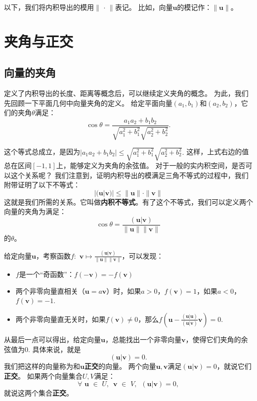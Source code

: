 \documentclass[12pt,UTF8,fontset=none]{ctexbook}
\begin{document}
以下，我们将内积导出的模用$\|\,\cdot\,\|$表记。
比如，向量$\mathbf{u}$的模记作：$\|\mathbf{u}\|$。

\section{夹角与正交}
\subsection{向量的夹角}
定义了内积导出的长度、距离等概念后，可以继续定义夹角的概念。
为此，我们先回顾一下平面几何中向量夹角的定义。
给定平面向量$(a_1, b_1)$和$(a_2, b_2)$，它们的夹角$\theta$满足：
$$ \cos \theta = \frac{a_1a_2 + b_1b_2}{\sqrt{a_1^2 + b_1^2}\sqrt{a_2^2 + b_2^2}}. $$

这个等式总成立，是因为$|a_1a_2 + b_1b_2| \leqslant \sqrt{a_1^2 + b_1^2}\sqrt{a_2^2 + b_2^2}.$ 
这样，上式右边的值总在区间$[-1,1]$上，能够定义为夹角的余弦值。
对于一般的实内积空间，是否可以这个关系呢？
我们注意到，证明内积导出的模满足三角不等式的过程中，我们附带证明了以下不等式：
$$ |(\mathbf{u} | \mathbf{v})| \leqslant \|\mathbf{u}\| \cdot \|\mathbf{v}\|$$
这就是我们所需的关系。它叫做\textbf{内积不等式}。有了这个不等式，我们可以定义两个向量的夹角为满足：
$$ \cos \theta = \frac{(\mathbf{u} | \mathbf{v})}{\|\mathbf{u}\|  \|\mathbf{v}\|} $$
的$\theta$。

给定向量$\mathbf{u}$，考察函数$ f: \,\, \mathbf{v} \mapsto \frac{(\mathbf{u} | \mathbf{v})}{\|\mathbf{u}\|  \|\mathbf{v}\|}$，可以发现：
\begin{itemize}
    \item $f$是一个“奇函数”：$f( -\mathbf{v}) = -f(\mathbf{v})$
    \item 两个非零向量直相关（$\mathbf{u} = a\mathbf{v}$）时，如果$a>0$，$f(\mathbf{v}) = 1$，如果$a<0$，$f(\mathbf{v}) = -1.$
    \item 两个非零向量直无关时，如果$f(\mathbf{v}) \neq 0$，那么$f\left(\mathbf{u}-\frac{(\mathbf{u} | \mathbf{u})}{(\mathbf{u} | \mathbf{v})}\mathbf{v}\right) = 0.$
\end{itemize}
从最后一点可以得出，给定向量$\mathbf{u}$，总能找出一个非零向量$\mathbf{v}$，使得它们夹角的余弦值为0. 具体来说，就是
$$ (\mathbf{u} | \mathbf{v}) = 0.$$
我们把这样的向量称为和$\mathbf{u}$\textbf{正交}的向量。
两个向量$\mathbf{u}, \mathbf{v}$满足$(\mathbf{u} | \mathbf{v}) = 0$，就说它们\textbf{正交}。
如果两个向量集合$U, V$满足：
$$ \forall \,\, \mathbf{u} \,\, \in \,\, U, \, \,\, \mathbf{v} \,\, \in \,\, V, \,\,\, (\mathbf{u} | \mathbf{v}) = 0,$$
就说这两个集合\textbf{正交}。
\end{document}
